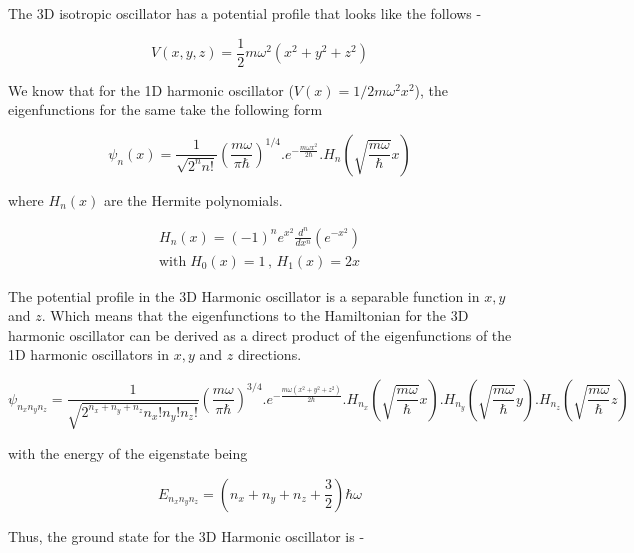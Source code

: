 
    The 3D isotropic oscillator has a potential profile that looks like the follows - 

    \begin{equation*}
        V(x,y,z) = \frac{1}{2}m\omega^2(x^2 + y^2 + z^2)
    \end{equation*}

    We know that for the 1D harmonic oscillator ($V(x) = 1/2 m\omega^2x^2$), the eigenfunctions for the same take the following form

    \begin{equation*}
        \psi_n(x) = \frac{1}{\sqrt{2^nn!}} \left( \frac{m\omega}{\pi\hbar} \right)^{1/4} . e^{-\frac{m\omega x^2}{2\hbar}} . H_n \left( \sqrt{\frac{m\omega}{\hbar}} x \right)
    \end{equation*}

    where $H_n(x)$ are the Hermite polynomials.

    \begin{gather*}
        H_n(x) = (-1)^n e^{x^2} \frac{d^n}{dx^n} (e^{-x^2}) \\
        \text{with} \; H_0(x) = 1 \, , \, H_1(x) = 2x
    \end{gather*}

    The potential profile in the 3D Harmonic oscillator is a separable function in $x,y$ and $z$. Which means that the eigenfunctions to the Hamiltonian for the 3D harmonic oscillator can be derived as a direct product of the eigenfunctions of the 1D harmonic oscillators in $x,y$ and $z$ directions.

    \begin{equation*}
        \psi_{n_xn_yn_z} = \frac{1}{\sqrt{2^{n_x + n_y + n_z} n_x! n_y! n_z!}} \left( \frac{m\omega}{\pi\hbar} \right)^{3/4} . e^{-\frac{m\omega (x^2 + y^2 + z^2)}{2\hbar}} . H_{n_x} \left( \sqrt{\frac{m\omega}{\hbar}} x \right) . H_{n_y} \left( \sqrt{\frac{m\omega}{\hbar}} y \right) . H_{n_z} \left( \sqrt{\frac{m\omega}{\hbar}} z \right)
    \end{equation*}

    with the energy of the eigenstate being

    \begin{equation*}
        E_{n_xn_yn_z} = \left( n_x + n_y + n_z + \frac{3}{2} \right) \hbar\omega
    \end{equation*}

    Thus, the ground state for the 3D Harmonic oscillator is - 

